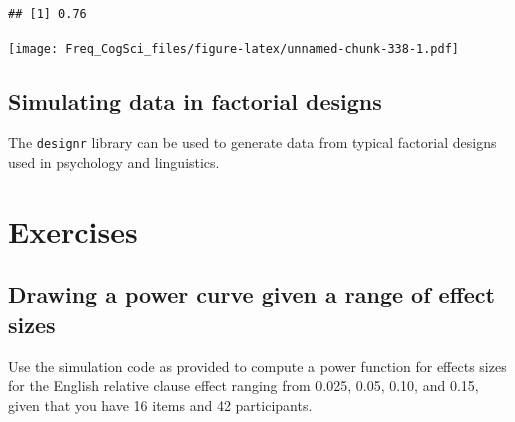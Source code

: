 \documentclass[12pt,]{krantz}
\newenvironment{Shaded}{\begin{snugshade}}{\end{snugshade}}
\newcommand{\ControlFlowTok}[1]{\textcolor[rgb]{0.13,0.29,0.53}{\textbf{#1}}}
\newcommand{\DataTypeTok}[1]{\textcolor[rgb]{0.13,0.29,0.53}{#1}}
\newcommand{\DecValTok}[1]{\textcolor[rgb]{0.00,0.00,0.81}{#1}}
\newcommand{\FloatTok}[1]{\textcolor[rgb]{0.00,0.00,0.81}{#1}}
\newcommand{\KeywordTok}[1]{\textcolor[rgb]{0.13,0.29,0.53}{\textbf{#1}}}
\newcommand{\NormalTok}[1]{#1}
\newcommand{\OperatorTok}[1]{\textcolor[rgb]{0.81,0.36,0.00}{\textbf{#1}}}
\newcommand{\OtherTok}[1]{\textcolor[rgb]{0.56,0.35,0.01}{#1}}
\newcommand{\StringTok}[1]{\textcolor[rgb]{0.31,0.60,0.02}{#1}}
\begin{document}
\begin{verbatim}
## [1] 0.76
\end{verbatim}

\begin{Shaded}
\end{Shaded}

\texttt{[image: Freq\_CogSci\_files/figure-latex/unnamed-chunk-338-1.pdf]}

\hypertarget{simulating-data-in-factorial-designs}{%
\subsection{Simulating data in factorial designs}\label{simulating-data-in-factorial-designs}}

The \texttt{designr} library can be used to generate data from typical factorial designs used in psychology and linguistics.

\hypertarget{sec:Simulationexercises}{%
\section{Exercises}\label{sec:Simulationexercises}}

\hypertarget{sec:SimulationexercisesPart1}{%
\subsection{Drawing a power curve given a range of effect sizes}\label{sec:SimulationexercisesPart1}}

Use the simulation code as provided to compute a power function for effects sizes for the English relative clause effect ranging from 0.025, 0.05, 0.10, and 0.15, given that you have 16 items and 42 participants.
\end{document}
